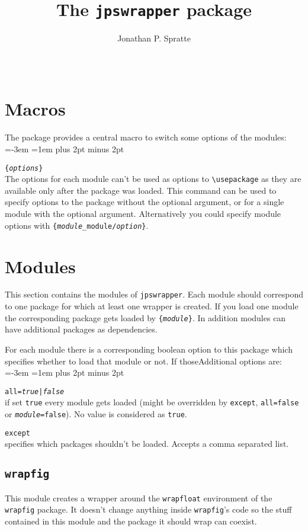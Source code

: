 \documentclass[a4paper,10pt]{scrartcl}
\title{The \texttt{jpswrapper} package}
\author{Jonathan P. Spratte}
\date{\jpswrapper@version\ \ \jpswrapper@date}
\newenvironment{codedescription}{%
  \parindent=-3em
  \parskip=1em plus 2pt minus 2pt
  \par
}{\par}
\newcommand*\optionTF{\textit{true}{\normalfont|}\textit{false}}
\begin{document}
\maketitle
\tableofcontents
\section{Macros}
The package provides a central macro to switch some options of the modules:
\begin{codedescription}
\texttt{\string{}\{\textit{options}\}}\\
  The options for each module can't be used as options to \verb|\usepackage| as
  they are available only after the package was loaded. This command can be used
  to specify options to the package without the optional argument, or for a
  single module with the optional argument. Alternatively you could specify
  module options with
  \texttt{\string\JPSWrapperOptions\{\textit{module}\_module/\textit{option}\}}.
\end{codedescription}

\section{Modules}
This section contains the modules of \texttt{jpswrapper}. Each module should
correspond to one package for which at least one wrapper is created. If you
load one module the corresponding package gets loaded by
\texttt{\string\RequirePackage\{\textit{module}\}}. In addition modules can have
additional packages as dependencies.

For each module there is a corresponding boolean option to this package which
specifies whether to load that module or not. If thoseAdditional options are:
\begin{codedescription}
\texttt{all=\optionTF}\\
  if set \texttt{true} every module gets loaded (might be overridden by
  \texttt{except}, \texttt{all=false} or \texttt{\textit{module}=false}). No
  value is considered as \texttt{true}.

\texttt{except}\\
  specifies which packages shouldn't be loaded. Accepts a comma separated list.
\end{codedescription}

\subsection{\texttt{wrapfig}}
This module creates a wrapper around the \texttt{wrapfloat} environment of the
\texttt{wrapfig} package. It doesn't change anything inside \texttt{wrapfig}'s
code so the stuff contained in this module and the package it should wrap can
coexist.
\end{document}
